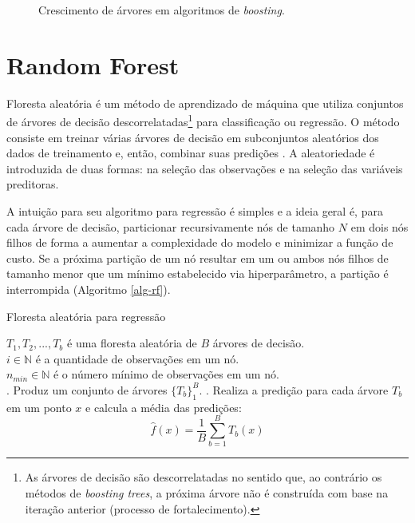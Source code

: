 \begin{apendicesenv}
\begin{figure}
  \caption{\label{fig-tree-growth}Crescimento de árvores em algoritmos de
  \emph{boosting}.}

\end{figure}

\section{Random Forest}\label{random-forest}

Floresta aleatória é um método de aprendizado de máquina que utiliza
conjuntos de árvores de decisão descorrelatadas\footnote{As árvores de
  decisão são descorrelatadas no sentido que, ao contrário os métodos de
  \emph{boosting trees}, a próxima árvore não é construída com base na
  iteração anterior (processo de fortalecimento).} para classificação ou
regressão. O método consiste em treinar várias árvores de decisão em
subconjuntos aleatórios dos dados de treinamento e, então, combinar suas
predições \autocite{hastie_elements_2009}. A aleatoriedade é introduzida
de duas formas: na seleção das observações e na seleção das variáveis
preditoras.

A intuição para seu algoritmo para regressão é simples e a ideia geral
é, para cada árvore de decisão, particionar recursivamente nós de
tamanho \(N\) em dois nós filhos de forma a aumentar a complexidade do
modelo e minimizar a função de custo. Se a próxima partição de um nó
resultar em um ou ambos nós filhos de tamanho menor que um mínimo
estabelecido via hiperparâmetro, a partição é interrompida (Algoritmo
\ref{alg-rf}).

\begin{algorithm}
\caption{Floresta aleatória para regressão}\label{alg-rf}

${T_1, T_2, ..., T_b}$ é uma floresta aleatória de $B$ árvores de decisão. \\
\BlankLine
$i \in \mathbb{N}$ é a quantidade de observações em um nó. \\
\BlankLine
$n_{min} \in \mathbb{N}$ é o número mínimo de observações em um nó. \\
\BlankLine
{}
. Produz um conjunto de árvores $\{T_b\}_1^B$.
. Realiza a predição para cada árvore $T_b$ em um ponto $x$ e calcula a média das predições:
$$\hat{f}(x) = \frac{1}{B}\sum_{b=1}^B T_b(x)$$


\end{algorithm}
\end{apendicesenv}
